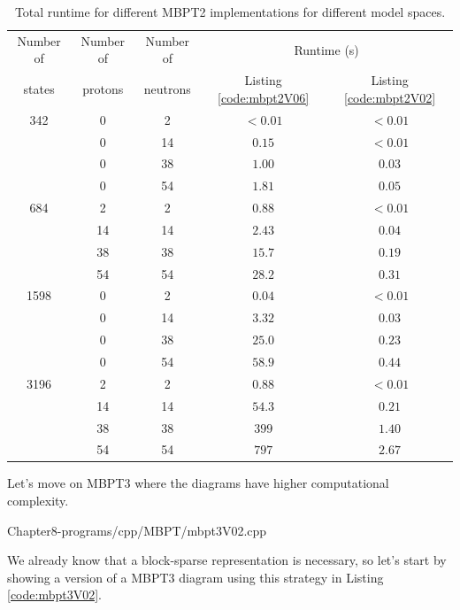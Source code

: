 \begin{table}
\caption{Total runtime for different MBPT2 implementations for different model spaces.}\label{tab:mbpt2V02_runtime}
  \begin{center}
      \begin{tabular}{ccccc}
      \hline
      Number of & Number of & Number of & \multicolumn{2}{c}{Runtime (s)} \\
      states & protons & neutrons & Listing \ref{code:mbpt2V06} & Listing \ref{code:mbpt2V02}\\
      \hline
      \hline
        342 & 0 & 2 & $< 0.01$ & $< 0.01$ \\
         & 0 & 14 & $0.15$ & $< 0.01$\\
         & 0 & 38 & $1.00$ & $0.03$\\
         & 0 & 54 & $1.81$ & $0.05$\\
         684 & 2 & 2 & $0.88$ & $< 0.01$\\
         & 14 & 14 & $2.43$ & $0.04$ \\
         & 38 & 38 & $15.7$ & $0.19$ \\
         & 54 & 54 & $28.2$ & $0.31$ \\
         1598 & 0 & 2 & $0.04$ & $< 0.01$\\
         & 0 & 14 & $3.32$ & $0.03$ \\
         & 0 & 38 & $25.0$ & $0.23$ \\
         & 0 & 54 & $58.9$ & $0.44$\\
         3196 & 2 & 2 & $0.88$ & $< 0.01$ \\
         & 14 & 14 & $54.3$ & $0.21$ \\
         & 38 & 38 & $399$ & $1.40$ \\
         & 54 & 54 & $797$ & $2.67$ \\
      \hline
      \end{tabular}
  \end{center}
\end{table}

    Let's move on MBPT3 where the diagrams have higher computational complexity.

{Chapter8-programs/cpp/MBPT/mbpt3V02.cpp}

    We already know that a block-sparse representation is necessary, so let's
    start by showing a version of a MBPT3 diagram using this strategy in Listing
    \ref{code:mbpt3V02}.
    
